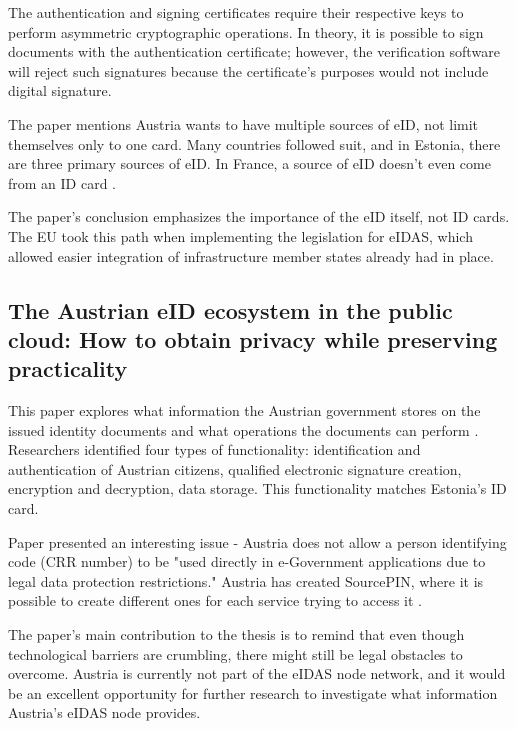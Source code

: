 The authentication and signing certificates require their respective keys to perform asymmetric cryptographic operations. In theory, it is possible to sign documents with the authentication certificate; however, the verification software will reject such signatures because the certificate's purposes would not include digital signature.


The paper mentions Austria wants to have multiple sources of eID, not limit themselves only to one card. Many countries followed suit, and in Estonia, there are three primary sources of eID. In France, a source of eID doesn't even come from an ID card \cite{eidas-notify-france}.

The paper's conclusion emphasizes the importance of the eID itself, not ID cards. The EU took this path when implementing the legislation for eIDAS, which allowed easier integration of infrastructure member states already had in place.

\subsection{The Austrian eID ecosystem in the public cloud: How to obtain privacy while preserving practicality}

This paper explores what information the Austrian government stores on the issued identity documents and what operations the documents can perform \cite{ZWATTENDORFER201635}. Researchers identified four types of functionality: identification and authentication of Austrian citizens, qualified electronic signature creation, encryption and decryption, data storage. This functionality matches Estonia's ID card.

Paper presented an interesting issue - Austria does not allow a person identifying code (CRR number) to be "used directly in e-Government applications due to legal data protection restrictions." Austria has created SourcePIN, where it is possible to create different ones for each service trying to access it \cite{ZWATTENDORFER201635,austria-eid-presentation}.

The paper's main contribution to the thesis is to remind that even though technological barriers are crumbling, there might still be legal obstacles to overcome. Austria is currently not part of the eIDAS node network, and it would be an excellent opportunity for further research to investigate what information Austria's eIDAS node provides.

